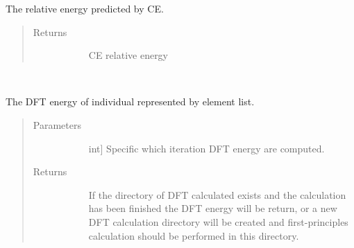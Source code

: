 \documentclass[letterpaper,10pt,english]{sphinxmanual}
\begin{document}
\begin{fulllineitems}
\begin{fulllineitems}
\begin{quote}
\begin{description}
\end{description}\end{quote}

\end{fulllineitems}


\begin{fulllineitems}
\label{\detokenize{pygace:pygace.utility.EleIndv.ce_energy_ref}}
The relative energy predicted by CE.
\begin{quote}\begin{description}
\item[{Returns}] \leavevmode\begin{description}
\item[{}] \leavevmode
CE relative energy

\end{description}

\end{description}\end{quote}

\end{fulllineitems}


\begin{fulllineitems}
\label{\detokenize{pygace:pygace.utility.EleIndv.ce_object}}~
\end{fulllineitems}


\begin{fulllineitems}
\label{\detokenize{pygace:pygace.utility.EleIndv.dft_energy}}
The DFT energy of individual represented by element list.
\begin{quote}\begin{description}
\item[{Parameters}] \leavevmode\begin{description}
\item[{}] \leavevmode{[}int{]}
Specific which iteration DFT energy are computed.

\end{description}

\item[{Returns}] \leavevmode\begin{description}
\item[{}] \leavevmode
If the directory of DFT calculated exists and the calculation has
been finished the DFT energy will be return, or a new DFT
calculation directory will be created and first-principles
calculation should be performed in this directory.


\end{description}
\end{description}
\end{quote}
\end{fulllineitems}
\end{fulllineitems}
\end{document}
